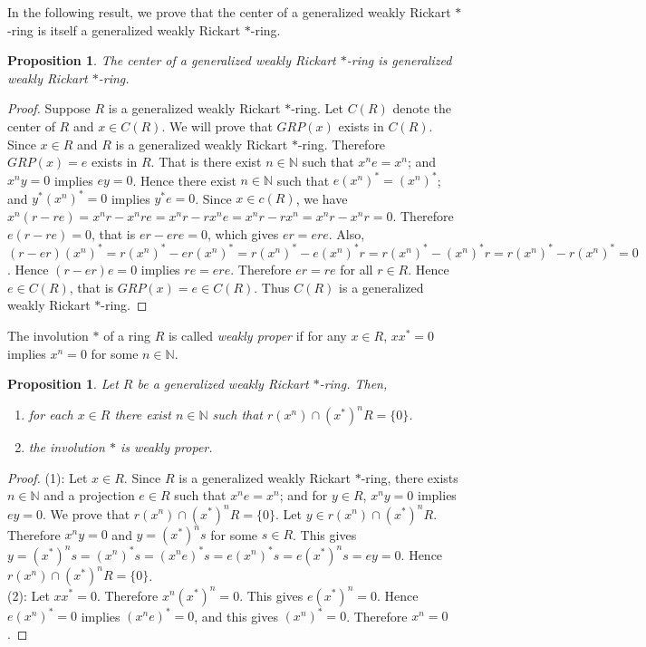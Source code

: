 \documentclass[11pt, one side,emlines]{amsart}
\newtheorem{proposition}[lemma]{Proposition}
\theoremstyle{definition}
\numberwithin{equation}{section} \thispagestyle{empty} \voffset
\begin{document}
In the following result, we prove that the center of a generalized weakly Rickart $*$-ring is itself a generalized weakly Rickart $*$-ring.
 
\begin{proposition} \label{s2pr9} The center of a generalized weakly Rickart $*$-ring is generalized weakly Rickart $*$-ring.
\end{proposition}
\begin{proof} Suppose $R$ is a generalized weakly Rickart $ *$-ring.
	Let $C(R)$ denote the center of $R$ and $x \in C(R) $.
	We will prove that $GRP(x)$ exists in $C(R)$.
	Since $x\in R$ and $R$ is a generalized weakly Rickart $*$-ring. 
	Therefore $GRP(x)=e$ exists in $R$. That is there exist $n \in \mathbb N$ such that $x^ne=x^n$; and $x^ny=0$ implies $ey=0 $. Hence there exist $n \in \mathbb N$ such that $e(x^n)^* =(x^n)^* $; and $y^*(x^n)^*=0$ implies $y^*e=0$.
	Since $x \in c(R)$, we have $x^n(r-re)=x^nr-x^nre=x^nr-rx^ne=x^nr-rx^n
	=x^nr-x^nr=0$. Therefore $e(r-re)=0$, that is $er-ere=0$, which gives $er=ere$.
	Also, $(r-er)(x^n)^*=r(x^n)^*-er(x^n)^*=r(x^n)^*-e(x^n)^*r=r(x^n)^*-(x^n)^*r=r(x^n)^*-r(x^n)^*=0$.
	Hence $(r-er)e=0$ implies $re=ere$.	Therefore $er=re$ for all $ r\in R $.
	Hence $e\in C(R)$, that is $ GRP(x)=e\in C(R)$. 
	Thus $C(R) $ is a generalized weakly Rickart $*$-ring.
\end{proof}	

  The involution $*$ of a ring $R$ is called {\it weakly proper} if for any $ x\in R $, $ xx^*=0$ implies $x^n=0$ for some $ n\in\mathbb N$.

 \begin{proposition} \label{s2pr10} Let $R$ be a generalized weakly Rickart $*$-ring. Then,\\
	\begin{enumerate}
		\item for each $ x\in R$ there exist $n \in \mathbb N$ such that $r(x^n) \cap(x^*)^nR=\{0\}$.
		\item the involution $*$ is weakly proper.
	\end{enumerate}
\end{proposition}
\begin{proof} (1): Let $x \in R$. Since $R$ is a generalized weakly Rickart $*$-ring, 
	 there exists $n\in\mathbb N$ and a projection $e \in R$ such that $x^ne=x^n$; and for $y \in R$, $x^ny=0$ implies $ey=0$. We prove that $r(x^n) \cap (x^*)^nR=\{0\}$.
	Let $y\in r(x^n)\cap (x^*)^nR$.
	Therefore $x^ny=0$ and $y=(x^*)^ns$ for some $ s\in R$.
	This gives $y=(x^*)^ns=(x^n)^*s=(x^ne)^*s=e(x^n)^*s=e(x^*)^ns=ey=0$.
	Hence $r(x^n)\cap (x^*)^nR=\{0\}$. \\
	(2): Let $ xx^*=0$. Therefore	
	 $x^n(x^*)^n=0$. This gives $e(x^*)^n=0$.
	Hence $e(x^n)^*=0$ implies $(x^ne)^*=0$, and this gives $(x^n)^*=0$. Therefore $x^n=0$.
\end{proof}
\end{document}
